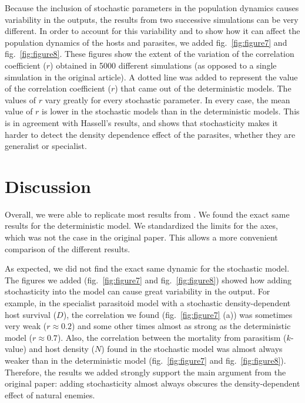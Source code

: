 \documentclass[10pt,a4paper,onecolumn]{article}
\begin{document}
Because the inclusion of stochastic parameters in the population
dynamics causes variability in the outputs, the results from two
successive simulations can be very different. In order to account for
this variability and to show how it can affect the population dynamics
of the hosts and parasites, we added fig.~\ref{fig:figure7} and
fig.~\ref{fig:figure8}. These figures show the extent of the variation
of the correlation coefficient (\(r\)) obtained in 5000 different
simulations (as opposed to a single simulation in the original article).
A dotted line was added to represent the value of the correlation
coefficient (\(r\)) that came out of the deterministic models. The
values of \(r\) vary greatly for every stochastic parameter. In every
case, the mean value of \(r\) is lower in the stochastic models than in
the deterministic models. This is in agreement with Hassell's results,
and shows that stochasticity makes it harder to detect the density
dependence effect of the parasites, whether they are generalist or
specialist.

\hypertarget{discussion}{%
\section{Discussion}\label{discussion}}

Overall, we were able to replicate most results from
\textcite{Hassell85}. We found the exact same results for the
deterministic model. We standardized the limits for the axes, which was
not the case in the original paper. This allows a more convenient
comparison of the different results.

As expected, we did not find the exact same dynamic for the stochastic
model. The figures we added (fig.~\ref{fig:figure7} and
fig.~\ref{fig:figure8}) showed how adding stochasticity into the model
can cause great variability in the output. For example, in the
specialist parasitoid model with a stochastic density-dependent host
survival (\(D\)), the correlation we found (fig.~\ref{fig:figure7} (a))
was sometimes very weak (\(r \approx 0.2\)) and some other times almost
as strong as the deterministic model (\(r \approx 0.7\)). Also, the
correlation between the mortality from parasitism (\(k\)-value) and host
density (\(N\)) found in the stochastic model was almost always weaker
than in the deterministic model (fig.~\ref{fig:figure7} and
fig.~\ref{fig:figure8}). Therefore, the results we added strongly
support the main argument from the original paper: adding stochasticity
almost always obscures the density-dependent effect of natural enemies.
\end{document}
